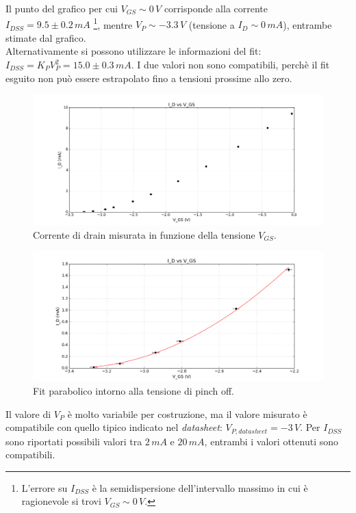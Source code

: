\documentclass[10pt,a4paper]{article}
\begin{document}
Il punto del grafico per cui $V_{GS} \sim 0\,V$ corrisponde alla corrente $I_{DSS} = 9.5 \pm 0.2\, mA$ \footnote{L'errore su $I_{DSS}$ è la semidispersione dell'intervallo massimo in cui è ragionevole si trovi $V_{GS} \sim 0\,V$.}, mentre $V_P \sim -3.3\,V$ (tensione a $I_D \sim 0 \, mA$), entrambe stimate dal grafico.\\
Alternativamente si possono utilizzare le informazioni del fit: $I_{DSS} = K_P V_{P}^2 = 15.0 \pm 0.3 \, mA$. I due valori non sono compatibili, perchè il fit esguito non può essere estrapolato fino a tensioni prossime allo zero.\\

\begin{figure}
\centering
\includegraphics[scale=0.5]{parabolaTutti.png}
\caption{Corrente di drain misurata in funzione della tensione $V_{GS}$.\label{tuttiIdati}}
\end{figure}

\begin{figure}
\centering
\includegraphics[scale=0.5]{parabolaFit.png}
\caption{Fit parabolico intorno alla tensione di pinch off.\label{correnteIdVgs}}
\end{figure}

Il valore di $V_P$ è molto variabile per costruzione, ma il valore misurato è compatibile con quello tipico indicato nel \emph{datasheet}: $V_{P, datasheet} = -3 \, V$. Per $I_{DSS}$ sono riportati possibili valori tra $2 \, mA$ e $20 \, mA$, entrambi i valori ottenuti sono compatibili.\\
\end{document}
